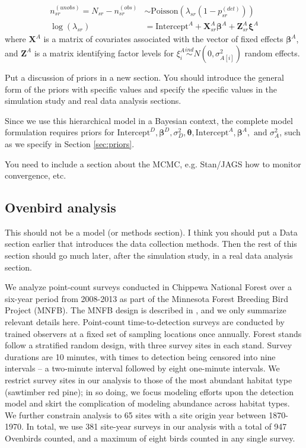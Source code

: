 \documentclass[useAMS,usenatbib,referee,12pt]{article}
\newcommand{\jarad}[1]{{\color{red} #1}}
\begin{document}
\begin{align}
\label{eq:binPois} n_{sr}^{(unobs)} = N_{sr} - n_{sr}^{(obs)} &\sim \mbox{Poisson}\left(\lambda_{sr}(1-p_{sr}^{(det)})\right)\\
\log (\lambda_{sr}) &= \text{Intercept}^A + \textbf{X}_{sr}^A\boldsymbol{\beta}^A + \textbf{Z}_{sr}^A\boldsymbol{\xi}^A
\end{align}
where $\textbf{X}^A$ is a matrix of covariates associated with the vector of fixed effects $\boldsymbol{\beta}^A$, and $\textbf{Z}^A$ is a matrix identifying factor levels for $\xi_i^A \overset{ind}{\sim} N(0,\sigma_{A[i]}^2)$ random effects. 

\jarad{Put a discussion of priors in a new section. You should introduce the general form of the priors with specific values and specify the specific values in the simulation study and real data analysis sections.}

Since we use this hierarchical model in a Bayesian context, the complete model formulation requires priors for $\text{Intercept}^D, \boldsymbol{\beta}^D, \sigma_{D}^2, \boldsymbol{\theta}, \text{Intercept}^A, \boldsymbol{\beta}^A, \text{ and } \sigma_{A}^2$, such as we specify in Section \ref{sec:priors}.

\jarad{You need to include a section about the MCMC, e.g. Stan/JAGS how to monitor convergence, etc.}


\subsection{Ovenbird analysis}\label{sec:ovenbirdanalysis}

\jarad{This should not be a model (or methods section). I think you should put a Data section earlier that introduces the data collection methods. Then the rest of this section should go much later, after the simulation study, in a real data analysis section. } 

We analyze point-count surveys conducted in Chippewa National Forest over a six-year period from 2008-2013 as part of the Minnesota Forest Breeding Bird Project (MNFB).  The MNFB design is described in \citet{Hanowski1995}, and we only summarize relevant details here.  Point-count time-to-detection surveys are conducted by trained observers at a fixed set of sampling locations once annually.  Forest stands follow a stratified random design, with three survey sites in each stand.  Survey durations are 10 minutes, with times to detection being censored into nine intervals -- a two-minute interval followed by eight one-minute intervals.  We restrict survey sites in our analysis to those of the most abundant habitat type (sawtimber red pine); in so doing, we focus modeling efforts upon the detection model and skirt the complication of modeling abundance across habitat types.  We further constrain analysis to 65 sites with a site origin year between 1870-1970.  In total, we use 381 site-year surveys in our analysis with a total of 947 Ovenbirds counted, and a maximum of eight birds counted in any single survey.
\end{document}
